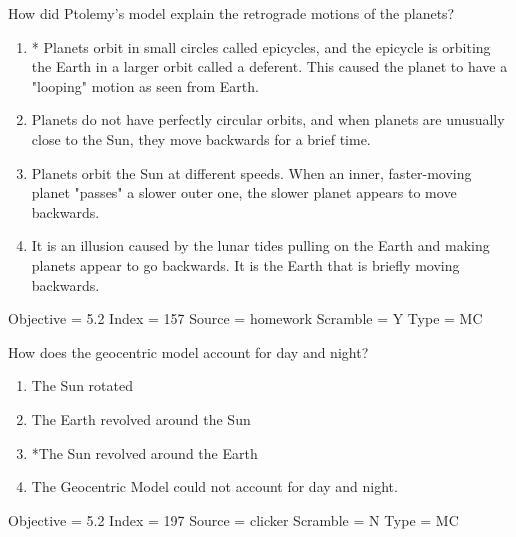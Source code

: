 \documentclass[11pt]{article}
\begin{document}
\begin{enumerate}
\begin{minipage}{\textwidth}
\begin{minipage}{\textwidth}
\item How did Ptolemy's model explain the retrograde motions of the planets?
\begin{enumerate} 
\setlength{\itemsep}{1pt} 
\setlength{\parskip}{0pt} 
\setlength{\parsep}{0pt}
\setlength{\multicolsep}{1pt} 
\item * Planets orbit in small circles called epicycles, and the epicycle is orbiting the Earth in a larger orbit called a deferent. This caused the planet to have a "looping" motion as seen from Earth.
\item  Planets do not have perfectly circular orbits, and when planets are unusually close to the Sun, they move backwards for a brief time.
\item  Planets orbit the Sun at different speeds. When an inner, faster-moving planet "passes" a slower outer one, the slower planet appears to move backwards.
\item  It is an illusion caused by the lunar tides pulling on the Earth and making planets appear to go backwards. It is the Earth that is briefly moving backwards.
\end{enumerate} 
Objective = 5.2
Index = 157
Source = homework
Scramble = Y
Type = MC
\end{minipage}
\end{minipage}
\vskip 0.20in

\begin{minipage}{\textwidth}
\begin{minipage}{\textwidth}
\item How does the geocentric model account for day and night?
\begin{enumerate} 
\setlength{\itemsep}{1pt} 
\setlength{\parskip}{0pt} 
\setlength{\parsep}{0pt}
\setlength{\multicolsep}{1pt} 
\item The Sun rotated
\item The Earth revolved around the Sun
\item *The Sun revolved around the Earth
\item The Geocentric Model could not account for day and night.
\end{enumerate} 
Objective = 5.2
Index = 197
Source = clicker
Scramble = N
Type = MC
\end{minipage}
\end{minipage}
\vskip 0.20in


\end{enumerate}
\end{document}
